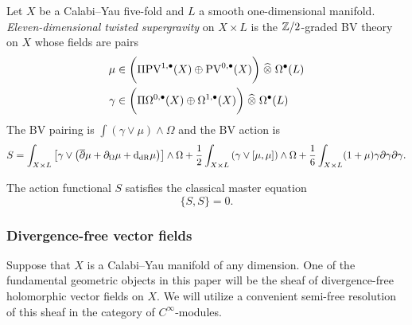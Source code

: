 \documentclass[11pt]{amsart}
\def\PV{{\rm PV}}
\begin{document}
\begin{dfn} \label{dfn:classical}
Let $X$ be a Calabi--Yau five-fold and $L$ a smooth one-dimensional manifold.
{\em Eleven-dimensional twisted supergravity} on $X \times L$ is the $\mathbb Z/2$-graded BV theory on $X$ whose fields are pairs
\begin{align*}
\mu & \in \bigg(\Pi \PV^{1,\bu}(X) \oplus \PV^{0,\bu}(X) \bigg) \; \Hat{\otimes} \; \Omega^{\bu}(L) \\
\gamma & \in \bigg(\Pi \Omega^{0,\bu}(X) \oplus \Omega^{1,\bu} (X) \bigg) \; \Hat{\otimes} \; \Omega^{\bu}(L) 
\end{align*}
The BV pairing is $\int (\gamma \vee \mu) \wedge \Omega$ and the BV action is
\begin{equation}\label{eqn:bvaction}
S = \int_{X \times L} \left[\gamma \vee \left(\overline{\partial} \mu + \partial_\Omega \mu + {\rm d}_{{\rm dR}} \mu\right) \right] \wedge \Omega +  \frac12 \int_{X \times L} \left(\gamma \vee [\mu, \mu] \right) \wedge \Omega  + \frac16 \int_{X \times L} (1+\mu) \gamma \partial \gamma \partial \gamma .
\end{equation}
\end{dfn}

\begin{prop} \label{prop:cme}
The action functional $S$ satisfies the classical master equation~
\[
\{S, S\}=0.
\] 
\end{prop}


\subsubsection{Divergence-free vector fields}

Suppose that $X$ is a Calabi--Yau manifold of any dimension. 
One of the fundamental geometric objects in this paper will be the sheaf of divergence-free holomorphic vector fields on $X$. 
We will utilize a convenient semi-free resolution of this sheaf in the category of $C^\infty$-modules. 

%
\end{document}
